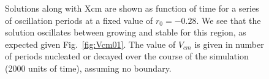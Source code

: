 \documentclass[pre,preprint,superscriptaddress]{revtex4-1}
\begin{document}
\begin{figure}[!htb]
\begin{center}
{      }
    \caption{Solutions along with Xcm are shown as  function of time for a series of oscillation periods at a fixed value of $r_0=-0.28$.  We see that the solution oscillates between growing and stable for this region, as expected given Fig.~\ref{fig:Vcm01}.  The value of $V_{cm}$ is given in number of periods nucleated or decayed over the course of the simulation (2000 units of time), assuming no boundary.}
    \label{fig:r28slice1}
  \end{center}
\end{figure} 

 \begin{figure}[!htb]
  \begin{center}
        \mbox{
	\quad 
      } \mbox{
	\quad
}
\end{center}
\end{figure}
\end{document}
